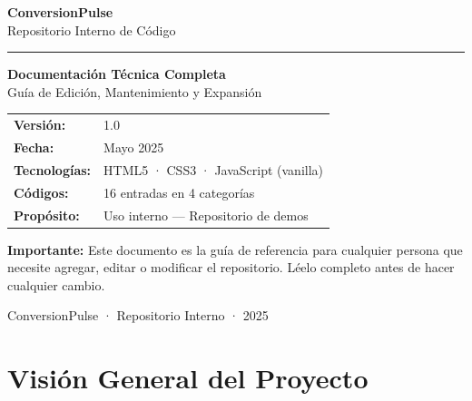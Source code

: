 \documentclass[12pt, a4paper]{article}
\begin{document}
\begin{titlepage}
    \centering
    \vspace*{2cm}

    {\Huge\bfseries\color{cpAccent} ConversionPulse}\\[0.5em]
    {\Large\color{black!70} Repositorio Interno de Código}

    \vspace{1.5cm}
    \noindent\textcolor{cpAccent}{\rule{10cm}{2pt}}
    \vspace{1.5cm}

    {\LARGE\bfseries Documentación Técnica Completa}\\[0.8em]
    {\large Guía de Edición, Mantenimiento y Expansión}

    \vspace{2cm}
    \begin{tabular}{ll}
        \textbf{Versión:}    & 1.0 \\[4pt]
        \textbf{Fecha:}      & Mayo 2025 \\[4pt]
        \textbf{Tecnologías:} & HTML5 · CSS3 · JavaScript (vanilla) \\[4pt]
        \textbf{Códigos:}    & 16 entradas en 4 categorías \\[4pt]
        \textbf{Propósito:}  & Uso interno — Repositorio de demos \\
    \end{tabular}

    \vspace{2cm}
    \begin{cajaAviso}
        \textbf{Importante:} Este documento es la guía de referencia para cualquier
        persona que necesite agregar, editar o modificar el repositorio.
        Léelo completo antes de hacer cualquier cambio.
    \end{cajaAviso}

    \vfill
    {\small\color{cpTextoClaro} ConversionPulse · Repositorio Interno · 2025}
\end{titlepage}

\tableofcontents
\newpage


\section{Visión General del Proyecto}
\end{document}
